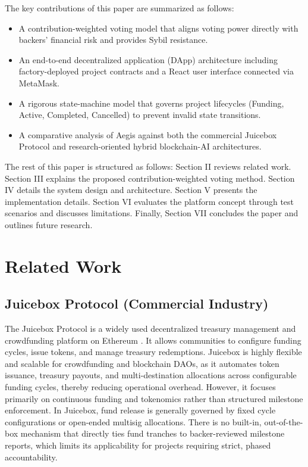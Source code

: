 \documentclass[conference]{IEEEtran}
\begin{document}
The key contributions of this paper are summarized as follows:
\begin{itemize}
	\item A contribution-weighted voting model that aligns voting power directly with backers' financial risk and provides Sybil resistance.
	\item An end-to-end decentralized application (DApp) architecture including factory-deployed project contracts and a React user interface connected via MetaMask.
	\item A rigorous state-machine model that governs project lifecycles (Funding, Active, Completed, Cancelled) to prevent invalid state transitions.
	\item A comparative analysis of Aegis against both the commercial Juicebox Protocol and research-oriented hybrid blockchain-AI architectures.
\end{itemize}

The rest of this paper is structured as follows: Section II reviews related work. Section III explains the proposed contribution-weighted voting method. Section IV details the system design and architecture. Section V presents the implementation details. Section VI evaluates the platform concept through test scenarios and discusses limitations. Finally, Section VII concludes the paper and outlines future research.

\section{Related Work}

\subsection{Juicebox Protocol (Commercial Industry)}
The Juicebox Protocol is a widely used decentralized treasury management and crowdfunding platform on Ethereum \cite{juicebox}. It allows communities to configure funding cycles, issue tokens, and manage treasury redemptions. Juicebox is highly flexible and scalable for crowdfunding and blockchain DAOs, as it automates token issuance, treasury payouts, and multi-destination allocations across configurable funding cycles, thereby reducing operational overhead. However, it focuses primarily on continuous funding and tokenomics rather than structured milestone enforcement. In Juicebox, fund release is generally governed by fixed cycle configurations or open-ended multisig allocations. There is no built-in, out-of-the-box mechanism that directly ties fund tranches to backer-reviewed milestone reports, which limits its applicability for projects requiring strict, phased accountability.
\end{document}
